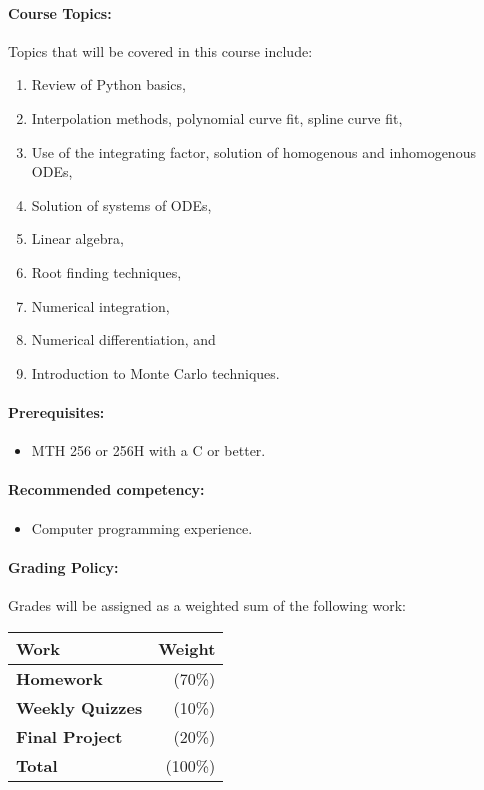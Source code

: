 \documentclass[11pt, a4paper]{article}
\begin{document}
\paragraph{Course Topics:}
\noindent Topics that will be covered in this course include:
\begin{enumerate}
\item Review of Python basics,
\item Interpolation methods, polynomial curve fit, spline curve fit,
\item Use of the integrating factor, solution of homogenous and inhomogenous ODEs, 
\item Solution of systems of ODEs,
\item Linear algebra,
\item Root finding techniques,
\item Numerical integration,
\item Numerical differentiation, and
\item Introduction to Monte Carlo techniques. 
\end{enumerate}

\paragraph{Prerequisites:}
\begin{itemize}
\item MTH 256 or 256H with a C or better. 
\end{itemize}

\paragraph{Recommended competency:}
\begin{itemize}
\item Computer programming experience. 
\end{itemize}

\paragraph{Grading Policy:} Grades will be assigned as a weighted sum of the following work:

\begin{table}[h]
\begin{tabularx}{\textwidth}{Xr}
\textbf{Work} & \textbf{Weight}\\
\hline
\textbf{Homework} & (70\%) \\
\textbf{Weekly Quizzes} & (10\%) \\
\textbf{Final Project} & (20\%) \\
\hline
\textbf{Total} & (100\%) \\
\end{tabularx}
\end{table}
\end{document}
